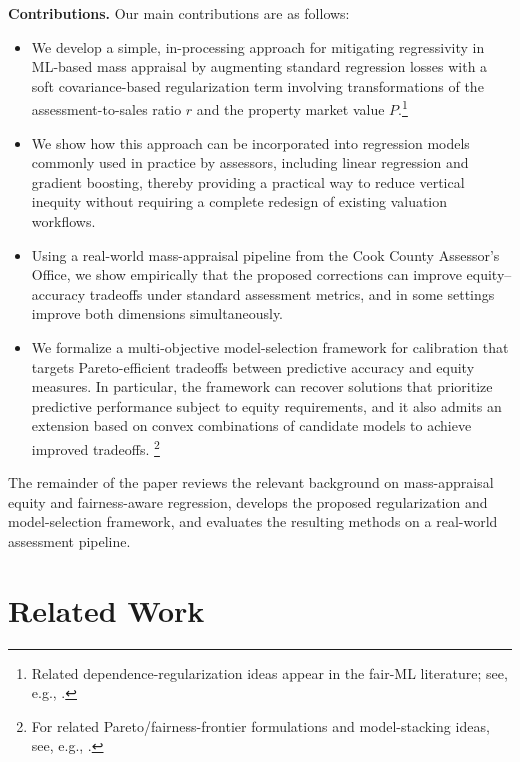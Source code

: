 \documentclass[12pt, draft]{article}
\theoremstyle{plain}
\theoremstyle{definition}
\newcommand{\1}{\mathbf{1}}
\begin{document}
\noindent \textbf{Contributions.} Our main contributions are as follows:
\begin{itemize}
    \item We develop a simple, in-processing approach for mitigating regressivity in ML-based mass appraisal by augmenting standard regression losses with a soft covariance-based regularization term involving transformations of the assessment-to-sales ratio $r$ and the property market value $P$.\footnote{Related dependence-regularization ideas appear in the fair-ML literature; see, e.g., \cite{lee2022maximal,LiEtAl2022Fairness,ScutariPaneroProissl2022}.}
    
    \item We show how this approach can be incorporated into regression models commonly used in practice by assessors, including linear regression and gradient boosting, thereby providing a practical way to reduce vertical inequity without requiring a complete redesign of existing valuation workflows.
    
    \item Using a real-world mass-appraisal pipeline from the Cook County Assessor's Office, we show empirically that the proposed corrections can improve equity--accuracy tradeoffs under standard assessment metrics, and in some settings improve both dimensions simultaneously.
    
    \item We formalize a multi-objective model-selection framework for calibration that targets Pareto-efficient tradeoffs between predictive accuracy and equity measures. In particular, the framework can recover solutions that prioritize predictive performance subject to equity requirements, and it also admits an extension based on convex combinations of candidate models to achieve improved tradeoffs. \footnote{For related Pareto/fairness-frontier formulations and model-stacking ideas, see, e.g., \cite{martinez2020minimax,little2022fairness}.}
\end{itemize}

The remainder of the paper reviews the relevant background on mass-appraisal equity and fairness-aware regression, develops the proposed regularization and model-selection framework, and evaluates the resulting methods on a real-world assessment pipeline.




\section{Related Work}
\end{document}
